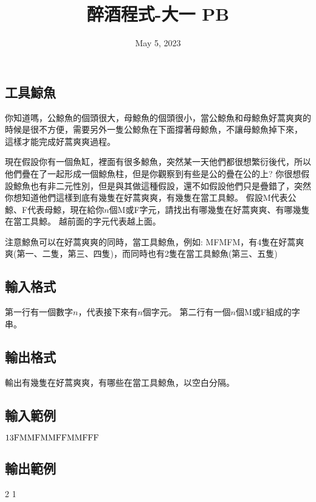 \documentclass{article}
\title{醉酒程式-大一 PB}
\date{May 5, 2023}
\begin{document}
\begin{CJK*}{UTF8}{bsmi}

\maketitle

\section*{工具鯨魚}

你知道嗎，公鯨魚的個頭很大，母鯨魚的個頭很小，當公鯨魚和母鯨魚好蒿爽爽的時候是很不方便，需要另外一隻公鯨魚在下面撐著母鯨魚，不讓母鯨魚掉下來，
這樣才能完成好蒿爽爽過程。

現在假設你有一個魚缸，裡面有很多鯨魚，突然某一天他們都很想繁衍後代，所以他們疊在了一起形成一個鯨魚柱，但是你觀察到有些是公的疊在公的上?
你很想假設鯨魚也有非二元性別，但是與其做這種假設，還不如假設他們只是疊錯了，突然你想知道他們這樣到底有幾隻在好蒿爽爽，有幾隻在當工具鯨。
假設M代表公鯨、F代表母鯨，現在給你$n$個M或F字元，請找出有哪幾隻在好蒿爽爽、有哪幾隻在當工具鯨。
越前面的字元代表越上面。

注意鯨魚可以在好蒿爽爽的同時，當工具鯨魚，例如: MFMFM，有4隻在好蒿爽爽(第一、二隻，第三、四隻)，而同時也有2隻在當工具鯨魚(第三、五隻)

\subsection*{輸入格式}
第一行有一個數字$n$，代表接下來有$n$個字元。
第二行有一個$n$個M或F組成的字串。

\subsection*{輸出格式}
輸出有幾隻在好蒿爽爽，有哪些在當工具鯨魚，以空白分隔。

\subsection*{輸入範例}
$13\\\text{FMMFMMFFMMFFF}$

\subsection*{輸出範例}
2 1

\end{CJK*}
\end{document}
